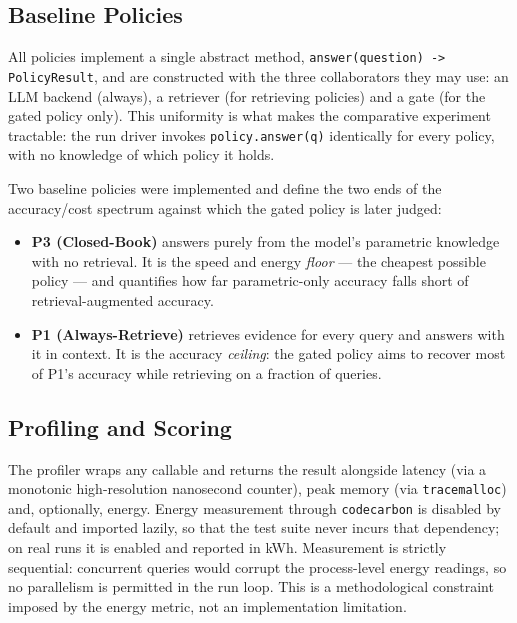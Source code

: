 \subsection{Baseline Policies}
\label{sec:impl-policies}

All policies implement a single abstract method,
\texttt{answer(question) -> PolicyResult}, and are constructed with the three
collaborators they may use: an LLM backend (always), a retriever (for
retrieving policies) and a gate (for the gated policy only). This uniformity
is what makes the comparative experiment tractable: the run driver invokes
\texttt{policy.answer(q)} identically for every policy, with no knowledge of
which policy it holds.

Two baseline policies were implemented and define the two ends of the
accuracy/cost spectrum against which the gated policy is later judged:

\begin{itemize}
  \item \textbf{P3 (Closed-Book)} answers purely from the model's parametric
        knowledge with no retrieval. It is the speed and energy \emph{floor}
        --- the cheapest possible policy --- and quantifies how far
        parametric-only accuracy falls short of retrieval-augmented accuracy.
  \item \textbf{P1 (Always-Retrieve)} retrieves evidence for every query and
        answers with it in context. It is the accuracy \emph{ceiling}: the
        gated policy aims to recover most of P1's accuracy while retrieving on
        a fraction of queries.
\end{itemize}

\subsection{Profiling and Scoring}
\label{sec:impl-eval}

The profiler wraps any callable and returns the result alongside latency
(via a monotonic high-resolution nanosecond counter), peak memory (via
\texttt{tracemalloc}) and, optionally, energy. Energy measurement through
\texttt{codecarbon} is disabled by default and imported lazily, so that the
test suite never incurs that dependency; on real runs it is enabled and
reported in kWh. Measurement is strictly sequential: concurrent queries would
corrupt the process-level energy readings, so no parallelism is permitted in
the run loop. This is a methodological constraint imposed by the energy
metric, not an implementation limitation.

